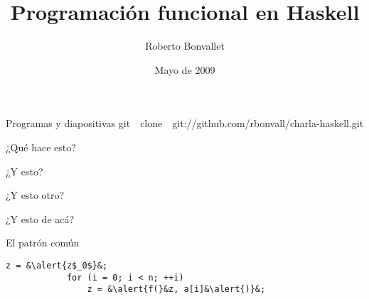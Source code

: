 \documentclass[12pt]{beamer}
\title {Programación funcional en Haskell}
\author{Roberto Bonvallet}
\institute[]{
    Departamento de Informática \\
    Universidad Técnica Federico Santa María
}
\date{Mayo de 2009}
\begin{document}
\begin{frame}
    \titlepage
\end{frame}

\begin{frame}
    \begin{block}{Programas y diapositivas}
        git~~clone~~git:/\!\!/github.com/rbonvall/charla-haskell.git
    \end{block}
\end{frame}
    
%    
%
%    
%
%    

\begin{frame}[fragile]
    \begin{block}{¿Qué hace esto?}
        
    \end{block}
    \pause
    \begin{block}{¿Y esto?}
        
    \end{block}
\end{frame}

\begin{frame}[fragile]
    \begin{block}{¿Y esto otro?}
        
    \end{block}
    \pause
    \begin{block}{¿Y esto de ac\'a?}
        
    \end{block}
\end{frame}

\begin{frame}[fragile]
    \begin{block}{El patr\'on com\'un}
        \LARGE
        \begin{lstlisting}[style=c,escapechar=\&,gobble=12]
            z = &\alert{z$_0$}&;
            for (i = 0; i < n; ++i)
                z = &\alert{f(}&z, a[i]&\alert{)}&;
        \end{lstlisting}
    \end{block}
\end{frame}
\end{document}
